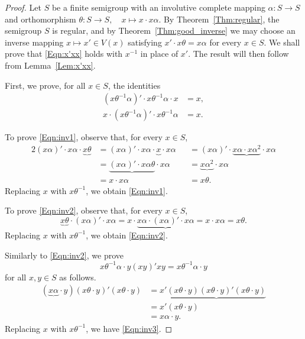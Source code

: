 \documentclass[11pt]{article}
\theoremstyle{plain}
\theoremstyle{remark}
\theoremstyle{definition}
\theoremstyle{plain}
\newcommand{\inv}{^{-1}}
\begin{document}
\begin{proof}
Let $S$ be a finite semigroup with an involutive complete mapping $\alpha\colon S\to S$ and orthomorphism $\theta\colon S\to S,\quad x\mapsto x\cdot x\alpha$.
By Theorem~\ref{Thm:regular}, the semigroup $S$ is regular, and by Theorem~\ref{Thm:good_inverse} we may choose an inverse mapping $x\mapsto x'\in V(x)$ satisfying $x'\cdot x\theta=x\alpha$ for every $x\in S$. We shall prove that \eqref{Eqn:x'xx} holds with $x\inv$ in place of $x'$. The result will then follow from Lemma~\ref{Lem:x'xx}.

First, we prove, for all $x\in S$, the identities
\begin{align}
(x\theta\inv\alpha)'\cdot x\theta\inv\alpha\cdot x &= x, \label{Eqn:inv1} \\
x\cdot (x\theta\inv\alpha)'\cdot x\theta\inv\alpha &= x. \label{Eqn:inv2}
\end{align}

To prove \eqref{Eqn:inv1}, observe that, for every $x\in S$,
\begin{alignat*}{2}
(x\alpha)'\cdot x\alpha\cdot \underbrace{x\theta}
    &= (x\alpha)'\cdot x\alpha\cdot \underbrace{x}\cdot x\alpha &&= (x\alpha)'\cdot \underbrace{x\alpha\cdot x\alpha^2}\cdot x\alpha \\
    &= \underbrace{(x\alpha)'\cdot x\alpha\theta}\cdot x\alpha &&= \underbrace{x\alpha^2} \cdot x\alpha \\
    &= x\cdot x\alpha &&= x\theta.
\end{alignat*}
Replacing $x$ with $x\theta\inv$, we obtain \eqref{Eqn:inv1}.

To prove \eqref{Eqn:inv2}, observe that, for every $x\in S$,
\[
\underbrace{x\theta}\cdot (x\alpha)'\cdot x\alpha = x\cdot \underbrace{x\alpha\cdot (x\alpha)'\cdot x\alpha} = x\cdot x\alpha = x\theta.
\]
Replacing $x$ with $x\theta\inv$, we obtain \eqref{Eqn:inv2}.

Similarly to \eqref{Eqn:inv2}, we prove
\begin{equation}\label{Eqn:inv3}
x\theta\inv\alpha\cdot y(xy)'xy = x\theta\inv\alpha\cdot y
\end{equation}
for all $x,y\in S$ as follows.
\begin{align*}
(\underbrace{x\alpha}\cdot y)(x\theta\cdot y)'(x\theta\cdot y) &= x'\underbrace{(x\theta\cdot y)(x\theta\cdot y)'(x\theta\cdot y)} \\
&= x'(x\theta\cdot y) \\
&= x\alpha\cdot y.
\end{align*}
Replacing $x$ with $x\theta\inv$, we have \eqref{Eqn:inv3}.


\end{proof}
\end{document}
